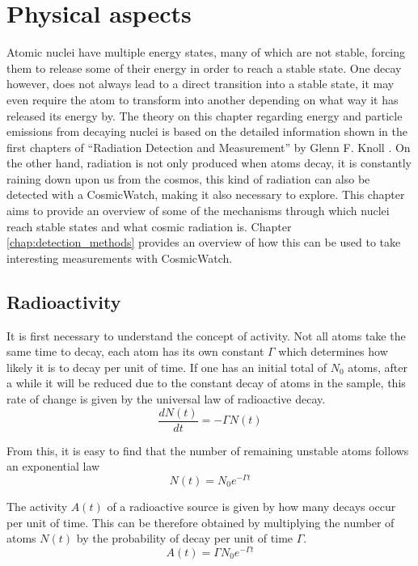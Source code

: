 \chapter{Physical aspects}

Atomic nuclei have multiple energy states, many of which are not stable, forcing them to release some of their energy in order to reach a stable state. One decay however, does not always lead to a direct transition into a stable state, it may even require the atom to transform into another depending on what way it has released its energy by. The theory on this chapter regarding energy and particle emissions from decaying nuclei is based on the detailed information shown in the first chapters of ``Radiation Detection and Measurement'' by Glenn F. Knoll \cite{knoll2010radiation}. On the other hand, radiation is not only produced when atoms decay, it is constantly raining down upon us from the cosmos, this kind of radiation can also be detected with a CosmicWatch, making it also necessary to explore. This chapter aims to provide an overview of some of the mechanisms through which nuclei reach stable states and what cosmic radiation is. Chapter \ref{chap:detection_methods} provides an overview of how this can be used to take interesting measurements with CosmicWatch.

\section{Radioactivity}

It is first necessary to understand the concept of activity. Not all atoms take the same time to decay, each atom has its own constant $\Gamma$ which determines how likely it is to decay per unit of time. If one has an initial total of $N_0$ atoms, after a while it will be reduced due to the constant decay of atoms in the sample, this rate of change is given by the universal law of radioactive decay.
\begin{equation}
    \frac{dN(t)}{dt} = -\Gamma N(t)
\end{equation}

From this, it is easy to find that the number of remaining unstable atoms follows an exponential law
\begin{equation}
    N(t) = N_0 e^{-\Gamma t}
\end{equation}

The activity $A(t)$ of a radioactive source is given by how many decays occur per unit of time. This can be therefore obtained by multiplying the number of atoms $N(t)$ by the probability of decay per unit of time $\Gamma$.
\begin{equation}
    A(t) = \Gamma N_0 e^{-\Gamma t}
\end{equation}

